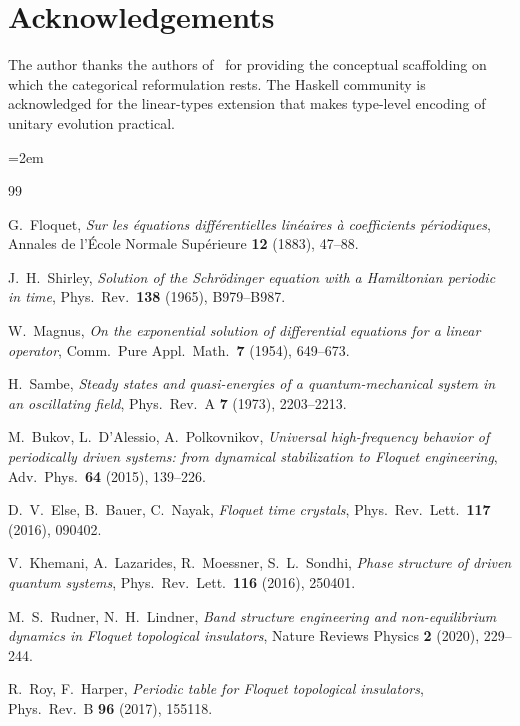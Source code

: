 \documentclass[12pt]{article}
\theoremstyle{definition}
\theoremstyle{remark}
\begin{document}
\section*{Acknowledgements}

The author thanks the authors of~\cite{floquet1883,shirley1965,bukov2015,else2016,khemani2016,rudner2020,roy2017} for providing the conceptual scaffolding on which the categorical reformulation rests. The Haskell community is acknowledged for the linear-types extension that makes type-level encoding of unitary evolution practical.

\emergencystretch=2em
\begin{thebibliography}{99}

G.~Floquet,
\emph{Sur les \'equations diff\'erentielles lin\'eaires \`a coefficients p\'eriodiques},
Annales de l'\'Ecole Normale Sup\'erieure \textbf{12} (1883), 47--88.

J.~H.~Shirley,
\emph{Solution of the Schr\"odinger equation with a Hamiltonian periodic in time},
Phys.\ Rev.\ \textbf{138} (1965), B979--B987.

W.~Magnus,
\emph{On the exponential solution of differential equations for a linear operator},
Comm.\ Pure Appl.\ Math.\ \textbf{7} (1954), 649--673.

H.~Sambe,
\emph{Steady states and quasi-energies of a quantum-mechanical system in an oscillating field},
Phys.\ Rev.\ A \textbf{7} (1973), 2203--2213.

M.~Bukov, L.~D'Alessio, A.~Polkovnikov,
\emph{Universal high-frequency behavior of periodically driven systems: from dynamical stabilization to Floquet engineering},
Adv.\ Phys.\ \textbf{64} (2015), 139--226.

D.~V.~Else, B.~Bauer, C.~Nayak,
\emph{Floquet time crystals},
Phys.\ Rev.\ Lett.\ \textbf{117} (2016), 090402.

V.~Khemani, A.~Lazarides, R.~Moessner, S.~L.~Sondhi,
\emph{Phase structure of driven quantum systems},
Phys.\ Rev.\ Lett.\ \textbf{116} (2016), 250401.

M.~S.~Rudner, N.~H.~Lindner,
\emph{Band structure engineering and non-equilibrium dynamics in Floquet topological insulators},
Nature Reviews Physics \textbf{2} (2020), 229--244.

R.~Roy, F.~Harper,
\emph{Periodic table for Floquet topological insulators},
Phys.\ Rev.\ B \textbf{96} (2017), 155118.


\end{thebibliography}
\end{document}
